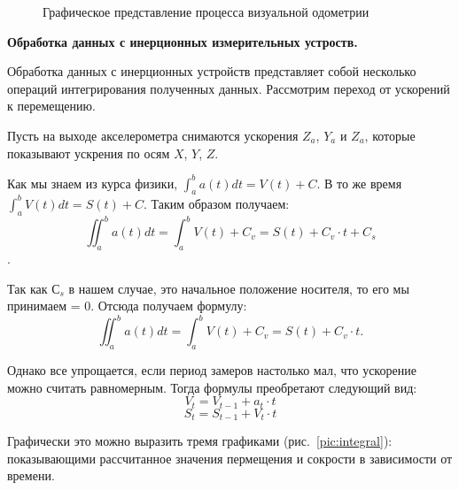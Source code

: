 \begin{figure}[!htb]
\caption{Графическое представление процесса визуальной одометрии}
\label{pic:visOdometryProc}
\end{figure}

\textbf{Обработка данных с инерционных измерительных устроств.}

Обработка данных с инерционных устройств представляет собой несколько операций интегрирования полученных данных. 
Рассмотрим переход от ускорений к перемещению.

Пусть на выходе акселерометра снимаются ускорения $Z_a$, $Y_a$ и $Z_a$, которые показывают ускрения по осям $X$, $Y$, $Z$.

Как мы знаем из курса физики, $ \int_a^b a(t)dt = V(t)+C $.
В то же время $ \int_a^b V(t)dt = S(t)+C $. Таким образом получаем:
$$
\iint_a^b a(t)dt = \int_a^b V(t) + C_v = S(t) + C_v \cdot t + C_s 
$$.

Так как $С_s$ в нашем случае, это начальное положение носителя, то его мы принимаем = 0. Отсюда получаем формулу:
$$
\iint_a^b a(t)dt = \int_a^b V(t) + C_v = S(t) + C_v \cdot t .
$$

Однако все упрощается, если период замеров настолько мал, что ускорение можно считать равномерным. Тогда формулы преобретают следующий вид:
$$ V_t = V_{t-1} + a_t \cdot t$$
$$ S_t = S_{t-1} + V_t \cdot t $$

Графически это можно выразить тремя графиками (рис.~\ref{pic:integral}): показывающими рассчитанное значения пермещения и сокрости в зависимости от времени. 

